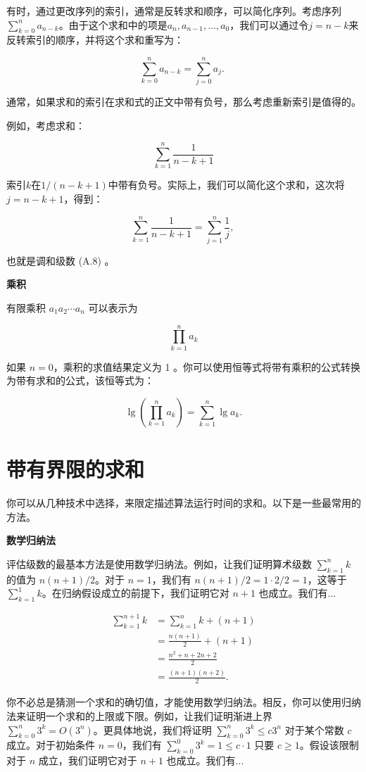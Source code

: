 \documentclass[lang=cn,newtx,10pt,scheme=chinese]{elegantbook}
\begin{document}
有时，通过更改序列的索引，通常是反转求和顺序，可以简化序列。考虑序列$\sum_{k=0}^n a_{n-k}$。由于这个求和中的项是$a_n, a_{n-1}, \ldots, a_0$，我们可以通过令$j=n-k$来反转索引的顺序，并将这个求和重写为：

$$
\sum_{k=0}^n a_{n-k}=\sum_{j=0}^n a_j \text {. }
$$

通常，如果求和的索引在求和式的正文中带有负号，那么考虑重新索引是值得的。

例如，考虑求和：

$$
\sum_{k=1}^n \frac{1}{n-k+1}
$$

索引$k$在$1/(n-k+1)$中带有负号。实际上，我们可以简化这个求和，这次将$j=n-k+1$，得到：

$$
\sum_{k=1}^n \frac{1}{n-k+1}=\sum_{j=1}^n \frac{1}{j} \text {, }
$$

也就是调和级数 (A.8) 。

\textbf{乘积}

有限乘积 $a_1 a_2 \cdots a_n$ 可以表示为

$$
\prod_{k=1}^n a_k
$$

如果 $n=0$，乘积的求值结果定义为 1 。你可以使用恒等式将带有乘积的公式转换为带有求和的公式，该恒等式为：

$$
\lg \left(\prod_{k=1}^n a_k\right)=\sum_{k=1}^n \lg a_k .
$$

\section{带有界限的求和}

你可以从几种技术中选择，来限定描述算法运行时间的求和。以下是一些最常用的方法。

\textbf{数学归纳法}

评估级数的最基本方法是使用数学归纳法。例如，让我们证明算术级数 $\sum_{k=1}^n k$ 的值为 $n(n+1) / 2$。对于 $n=1$，我们有 $n(n+1) / 2=1 \cdot 2 / 2=1$，这等于 $\sum_{k=1}^1 k$。在归纳假设成立的前提下，我们证明它对 $n+1$ 也成立。我们有...

$$
\begin{aligned}
\sum_{k=1}^{n+1} k & =\sum_{k=1}^n k+(n+1) \\
& =\frac{n(n+1)}{2}+(n+1) \\
& =\frac{n^2+n+2 n+2}{2} \\
& =\frac{(n+1)(n+2)}{2} .
\end{aligned}
$$

你不必总是猜测一个求和的确切值，才能使用数学归纳法。相反，你可以使用归纳法来证明一个求和的上限或下限。例如，让我们证明渐进上界 $\sum_{k=0}^n 3^k=O\left(3^n\right)$。更具体地说，我们将证明 $\sum_{k=0}^n 3^k \leq c 3^n$ 对于某个常数 $c$ 成立。对于初始条件 $n=0$，我们有 $\sum_{k=0}^0 3^k=1 \leq c \cdot 1$ 只要 $c \geq 1$。假设该限制对于 $n$ 成立，我们证明它对于 $n+1$ 也成立。我们有...
\end{document}
